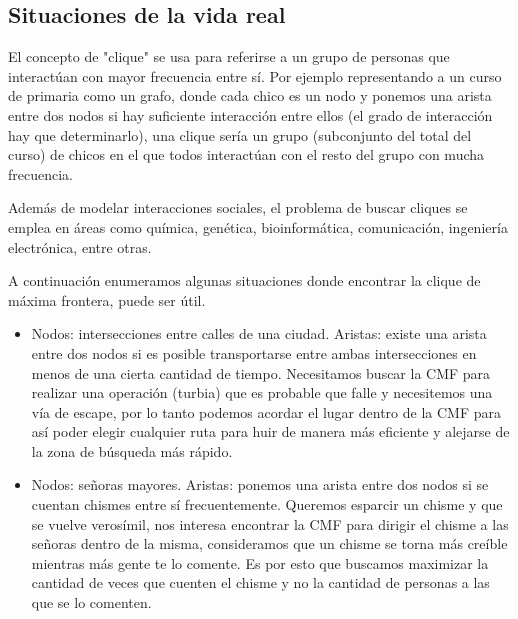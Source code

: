 \subsection{Situaciones de la vida real} 

El concepto de "clique" se usa para referirse a un grupo de personas que interactúan con mayor frecuencia entre sí. Por ejemplo representando a un curso de primaria como un grafo, donde cada chico es un nodo y ponemos una arista entre dos nodos si hay suficiente interacción entre ellos (el grado de interacción hay que determinarlo), una clique sería un grupo (subconjunto del total del curso) de chicos en el que todos interactúan con el resto del grupo con mucha frecuencia.

Además de modelar interacciones sociales, el problema de buscar cliques se emplea en áreas como química, genética, bioinformática, comunicación, ingeniería electrónica, entre otras.

A continuación enumeramos algunas situaciones donde encontrar la clique de máxima frontera, puede ser útil.

\begin{itemize}

 \item Nodos: intersecciones entre calles de una ciudad. Aristas: existe una arista entre dos nodos si es posible transportarse entre ambas intersecciones en menos de una cierta cantidad de tiempo.
Necesitamos buscar la CMF para realizar una operación (turbia) que es probable que falle y necesitemos una vía de escape, por lo tanto podemos acordar el lugar dentro de la CMF para así poder elegir cualquier ruta para huir de manera más eficiente y alejarse de la zona de búsqueda más rápido.

 \item Nodos: señoras mayores. Aristas: ponemos una arista entre dos nodos si se cuentan chismes entre sí frecuentemente. Queremos esparcir un chisme y que se vuelve verosímil, nos interesa encontrar la CMF para dirigir el chisme a las señoras dentro de la misma, consideramos que un chisme se torna más creíble mientras más gente te lo comente. Es por esto que buscamos maximizar la cantidad de veces que cuenten el chisme y no la cantidad de personas a las que se lo comenten.

\end{itemize}
